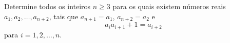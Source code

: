 Determine todos os inteiros $n \ge 3$ para os quais existem números reais $a_1, a_2, \dots, a_{n+2}$, tais que $a_{n+1} = a_1$, $a_{n+2} = a_2$ e
$$a_ia_{i+1} + 1 = a_{i+2}$$
para $i = 1, 2, \dots, n$.